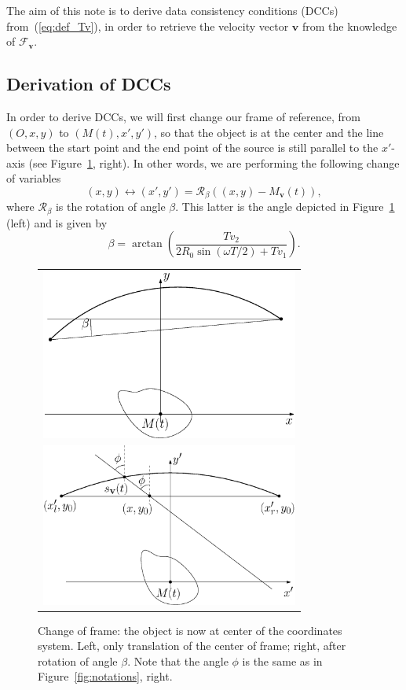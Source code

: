 \documentclass[9pt,technote]{IEEEtran}
\numberwithin{equation}{section}
\newcommand{\bv}{\mathbf{v}}
\newcommand{\Mbv}{M_{\mathbf{v}}}
\newcommand{\Tbv}{\mathcal{F}_{\mathbf{v}}}
\begin{document}
The aim of this note is to derive data consistency conditions (DCCs) from~(\ref{eq:def_Tv}), in order to retrieve the velocity vector $\bv$ from the knowledge of $\Tbv$.

\subsection{Derivation of DCCs}

In order to derive DCCs, we will first change our frame of reference, from $\left(O, x, y\right)$ to $\left(M(t), x', y'\right)$, so that the object is at the center and the line between the start point and the end point of the source is still parallel to the $x'$-axis (see Figure~\ref{fig:change_frame}, right). In other words, we are performing the following change of variables
\begin{equation}
	(x,y) \leftrightarrow (x',y') = \mathcal{R}_{\beta} \left( (x,y)-\Mbv(t) \right),
\end{equation}
where $\mathcal{R}_{\beta}$ is the rotation of angle $\beta$. This latter is the angle depicted in Figure~\ref{fig:change_frame} (left) and is given by
\begin{equation}
	\beta = \arctan \left( \frac{T v_2}{2R_0 \sin(\omega T/2) + T v_1} \right).
\end{equation}

\begin{figure}[!ht]
	\centering
	\begin{tabular}{c}
	\includegraphics[width=85mm]{figs/frame_object_before_rotation.eps} \\
	\includegraphics[width=85mm]{figs/frame_object.eps}
	\end{tabular}
	\caption{Change of frame: the object is now at center of the coordinates system. Left, only translation of the center of frame; right, after rotation of angle $\beta$. Note that the angle $\phi$ is the same as in Figure~\ref{fig:notations}, right.\label{fig:change_frame}}
\end{figure}
\end{document}
